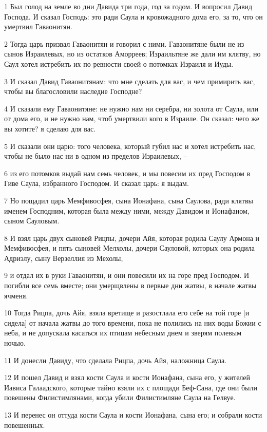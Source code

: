 \par 1 Был голод на земле во дни Давида три года, год за годом. И вопросил Давид Господа. И сказал Господь: это ради Саула и кровожадного дома его, за то, что он умертвил Гаваонитян.
\par 2 Тогда царь призвал Гаваонитян и говорил с ними. Гаваонитяне были не из сынов Израилевых, но из остатков Аморреев; Израильтяне же дали им клятву, но Саул хотел истребить их по ревности своей о потомках Израиля и Иуды.
\par 3 И сказал Давид Гаваонитянам: что мне сделать для вас, и чем примирить вас, чтобы вы благословили наследие Господне?
\par 4 И сказали ему Гаваонитяне: не нужно нам ни серебра, ни золота от Саула, или от дома его, и не нужно нам, чтоб умертвили кого в Израиле. Он сказал: чего же вы хотите? я сделаю для вас.
\par 5 И сказали они царю: того человека, который губил нас и хотел истребить нас, чтобы не было нас ни в одном из пределов Израилевых, --
\par 6 из его потомков выдай нам семь человек, и мы повесим их пред Господом в Гиве Саула, избранного Господом. И сказал царь: я выдам.
\par 7 Но пощадил царь Мемфивосфея, сына Ионафана, сына Саулова, ради клятвы именем Господним, которая была между ними, между Давидом и Ионафаном, сыном Сауловым.
\par 8 И взял царь двух сыновей Рицпы, дочери Айя, которая родила Саулу Армона и Мемфивосфея, и пять сыновей Мелхолы, дочери Сауловой, которых она родила Адриэлу, сыну Верзеллия из Мехолы,
\par 9 и отдал их в руки Гаваонитян, и они повесили их на горе пред Господом. И погибли все семь вместе; они умерщвлены в первые дни жатвы, в начале жатвы ячменя.
\par 10 Тогда Рицпа, дочь Айя, взяла вретище и разостлала его себе на той горе [и сидела] от начала жатвы до того времени, пока не полились на них воды Божии с неба, и не допускала касаться их птицам небесным днем и зверям полевым ночью.
\par 11 И донесли Давиду, что сделала Рицпа, дочь Айя, наложница Саула.
\par 12 И пошел Давид и взял кости Саула и кости Ионафана, сына его, у жителей Иависа Галаадского, которые тайно взяли их с площади Беф-Сана, где они были повешены Филистимлянами, когда убили Филистимляне Саула на Гелвуе.
\par 13 И перенес он оттуда кости Саула и кости Ионафана, сына его; и собрали кости повешенных.
